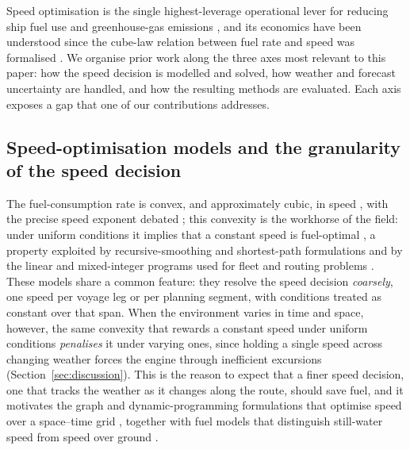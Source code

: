 \documentclass[review,authoryear]{elsarticle}
\begin{document}
Speed optimisation is the single highest-leverage operational lever for reducing ship fuel use and
greenhouse-gas emissions \citep{Bouman2017, IMO2023}, and its economics have been understood since the
cube-law relation between fuel rate and speed was formalised \citep{Ronen2011, Psaraftis2013}. We
organise prior work along the three axes most relevant to this paper: how the speed decision is
modelled and solved, how weather and forecast uncertainty are handled, and how the resulting methods
are evaluated. Each axis exposes a gap that one of our contributions addresses.

\subsection{Speed-optimisation models and the granularity of the speed decision}
The fuel-consumption rate is convex, and approximately cubic, in speed \citep{Ronen2011}, with the
precise speed exponent debated \citep{Psaraftis2023}; this convexity is the workhorse of the field:
under uniform conditions it implies that a constant speed is fuel-optimal \citep{Hvattum2013}, a property exploited by recursive-smoothing
and shortest-path formulations \citep{Norstad2011, Fagerholt2010} and by the linear and mixed-integer
programs used for fleet and routing problems \citep{Bektas2011, Wang2012}. These models share a common
feature: they resolve the speed decision \emph{coarsely}, one speed per voyage leg or per planning
segment, with conditions treated as constant over that span. When the environment varies in time and
space, however, the same convexity that rewards a constant speed under uniform conditions
\emph{penalises} it under varying ones, since holding a single speed across changing weather forces the
engine through inefficient excursions (Section~\ref{sec:discussion}). This is the reason to expect that
a finer speed decision, one that tracks the weather as it changes along the route, should save
fuel, and it motivates the graph and dynamic-programming formulations that optimise speed over a
space--time grid \citep{Zaccone2018}, together with fuel models that distinguish still-water speed from
speed over ground \citep{yang2020}.
\end{document}
